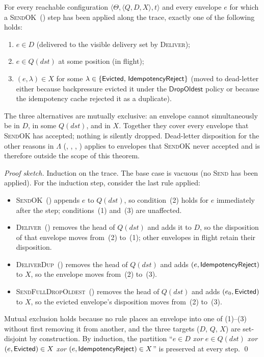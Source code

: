 \begin{theorem}
\label{thm:no-message-loss}
For every reachable configuration \(\langle \Theta,
\langle Q, D, X\rangle, t\rangle\) and every envelope \(e\) for which
a \textsc{SendOK}~() step has been applied along
the trace, exactly one of the following holds:
\begin{enumerate}
\item \(e \in D\) (delivered to the visible delivery set by
\textsc{Deliver});
\item \(e \in Q(\mathit{dst})\) at some position (in flight);
\item \((e, \lambda) \in X\) for some
\(\lambda \in \{\mathsf{Evicted},\, \mathsf{IdempotencyReject}\}\)
(moved to dead-letter either because backpressure evicted it under
the \(\mathsf{DropOldest}\) policy or because the idempotency cache
rejected it as a duplicate).
\end{enumerate}
The three alternatives are mutually exclusive: an envelope cannot
simultaneously be in \(D\), in some \(Q(\mathit{dst})\), and in
\(X\).  Together they cover every envelope that \textsc{SendOK}
has accepted; nothing is silently dropped.  Dead-letter disposition
for the other reasons in \(\Lambda\) (,
, , )
applies to envelopes that \textsc{SendOK} never accepted and is
therefore outside the scope of this theorem.
\end{theorem}

\begin{proof}[Proof sketch]
Induction on the trace.  The base case is vacuous (no \textsc{Send}
has been applied).  For the induction step, consider the last rule
applied:
\begin{itemize}
\item \textsc{SendOK}~() appends \(e\) to
\(Q(\mathit{dst})\), so condition~(2) holds for \(e\) immediately
after the step; conditions~(1) and~(3) are unaffected.
\item \textsc{Deliver}~() removes the head of
\(Q(\mathit{dst})\) and adds it to \(D\), so the disposition of that
envelope moves from~(2) to~(1); other envelopes in flight retain
their disposition.
\item \textsc{DeliverDup}~() removes the
head of \(Q(\mathit{dst})\) and adds \((e, \mathsf{IdempotencyReject})\)
to \(X\), so the envelope moves from~(2) to~(3).
\item \textsc{SendFullDropOldest}~()
removes the head of \(Q(\mathit{dst})\) and adds \((e_0,
\mathsf{Evicted})\) to \(X\), so the evicted envelope's disposition
moves from~(2) to~(3).
\end{itemize}
Mutual exclusion holds because no rule places an envelope into one
of (1)--(3) without first removing it from another, and the three
targets (\(D\), \(Q\), \(X\)) are set-disjoint by construction.  By
induction, the partition ``\(e \in D\) \emph{xor} \(e \in
Q(\mathit{dst})\) \emph{xor} \((e, \mathsf{Evicted}) \in X\) \emph{xor}
\((e, \mathsf{IdempotencyReject}) \in X\)'' is preserved at every
step.
\qed
\end{proof}

